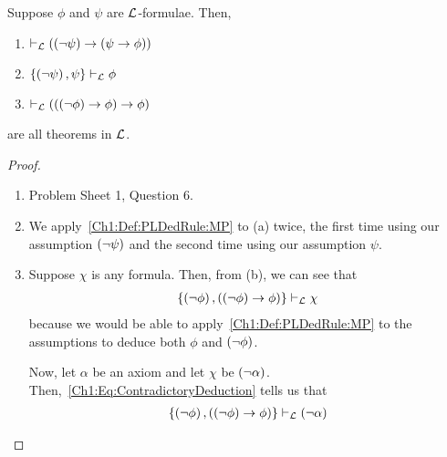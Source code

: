 \begin{boxexample}
    Suppose $\phi$ and $\psi$ are $\mathcal{L}$-formulae. Then,
    \begin{enumerate}[label = \normalfont (\alph*)]
        \item $\vdash_{\mathcal{L}} \left( \left( \neg \psi \right) \to \left( \psi \to \phi \right) \right)$
        \item $\left\{ \left( \neg \psi \right), \psi \right\} \vdash_{\mathcal{L}} \phi$
        \item $\vdash_{\mathcal{L}} \left( \left( \left( \neg \phi \right) \to \phi \right) \to \phi \right)$
    \end{enumerate}
    are all theorems in $\mathcal{L}$.
    \begin{proof}
        \hfill
        \begin{enumerate}[label = (\alph*)]
            \item Problem Sheet 1, Question 6. \sorry
            
            \item We apply~\ref{Ch1:Def:PLDedRule:MP} to (a) twice, the first time using our assumption $\left( \neg \psi \right)$ and the second time using  our assumption $\psi$.
            
            \item Suppose $\chi$ is any formula. Then, from (b), we can see that
            \begin{align}
                \left\{ \left( \neg \phi \right), \left( \left( \neg \phi \right) \to \phi \right) \right\} \vdash_{\mathcal{L}} \chi
                \label{Ch1:Eq:ContradictoryDeduction}
            \end{align}
            because we would be able to apply~\ref{Ch1:Def:PLDedRule:MP} to the assumptions to deduce both $\phi$ and $\left( \neg \phi \right)$.
            
            Now, let $\alpha$ be an axiom and let $\chi$ be $\left( \neg \alpha \right)$. Then,~\eqref{Ch1:Eq:ContradictoryDeduction} tells us that
            \begin{align*}
                \left\{ \left( \neg \phi \right), \left( \left( \neg \phi \right) \to \phi \right) \right\} \vdash_{\mathcal{L}} \left( \neg \alpha \right)
            \end{align*}
            \sorry %
        \end{enumerate}
    \end{proof}
\end{boxexample}